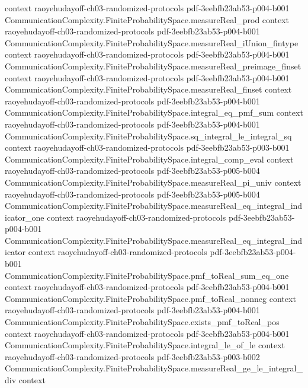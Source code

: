 \begin{theorem}
  {context}
  {raoyehudayoff-ch03-randomized-protocols}
  {pdf-3eebfb23ab53-p004-b001}
\proofstep
  {CommunicationComplexity.FiniteProbabilitySpace.measureReal_prod}
  {context}
  {raoyehudayoff-ch03-randomized-protocols}
  {pdf-3eebfb23ab53-p004-b001}
\proofstep
  {CommunicationComplexity.FiniteProbabilitySpace.measureReal_iUnion_fintype}
  {context}
  {raoyehudayoff-ch03-randomized-protocols}
  {pdf-3eebfb23ab53-p004-b001}
\proofstep
  {CommunicationComplexity.FiniteProbabilitySpace.measureReal_preimage_finset}
  {context}
  {raoyehudayoff-ch03-randomized-protocols}
  {pdf-3eebfb23ab53-p004-b001}
\proofstep
  {CommunicationComplexity.FiniteProbabilitySpace.measureReal_finset}
  {context}
  {raoyehudayoff-ch03-randomized-protocols}
  {pdf-3eebfb23ab53-p004-b001}
\proofstep
  {CommunicationComplexity.FiniteProbabilitySpace.integral_eq_pmf_sum}
  {context}
  {raoyehudayoff-ch03-randomized-protocols}
  {pdf-3eebfb23ab53-p004-b001}
\proofstep
  {CommunicationComplexity.FiniteProbabilitySpace.sq_integral_le_integral_sq}
  {context}
  {raoyehudayoff-ch03-randomized-protocols}
  {pdf-3eebfb23ab53-p003-b001}
\proofstep
  {CommunicationComplexity.FiniteProbabilitySpace.integral_comp_eval}
  {context}
  {raoyehudayoff-ch03-randomized-protocols}
  {pdf-3eebfb23ab53-p005-b004}
\proofstep
  {CommunicationComplexity.FiniteProbabilitySpace.measureReal_pi_univ}
  {context}
  {raoyehudayoff-ch03-randomized-protocols}
  {pdf-3eebfb23ab53-p005-b004}
\proofstep
  {CommunicationComplexity.FiniteProbabilitySpace.measureReal_eq_integral_indicator_one}
  {context}
  {raoyehudayoff-ch03-randomized-protocols}
  {pdf-3eebfb23ab53-p004-b001}
\proofstep
  {CommunicationComplexity.FiniteProbabilitySpace.measureReal_eq_integral_indicator}
  {context}
  {raoyehudayoff-ch03-randomized-protocols}
  {pdf-3eebfb23ab53-p004-b001}
\proofstep
  {CommunicationComplexity.FiniteProbabilitySpace.pmf_toReal_sum_eq_one}
  {context}
  {raoyehudayoff-ch03-randomized-protocols}
  {pdf-3eebfb23ab53-p004-b001}
\proofstep
  {CommunicationComplexity.FiniteProbabilitySpace.pmf_toReal_nonneg}
  {context}
  {raoyehudayoff-ch03-randomized-protocols}
  {pdf-3eebfb23ab53-p004-b001}
\proofstep
  {CommunicationComplexity.FiniteProbabilitySpace.exists_pmf_toReal_pos}
  {context}
  {raoyehudayoff-ch03-randomized-protocols}
  {pdf-3eebfb23ab53-p004-b001}
\proofstep
  {CommunicationComplexity.FiniteProbabilitySpace.integral_le_of_le}
  {context}
  {raoyehudayoff-ch03-randomized-protocols}
  {pdf-3eebfb23ab53-p003-b002}
\proofstep
  {CommunicationComplexity.FiniteProbabilitySpace.measureReal_ge_le_integral_div}
  {context}

\end{theorem}
